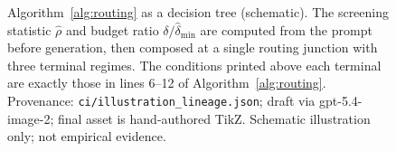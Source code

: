 \begin{figure}[!htb]
{
}
\caption{Algorithm~\ref{alg:routing} as a decision tree (schematic). The screening statistic $\hat{\rho}$ and budget ratio $\delta/\widehat{\delta}_{\min}$ are computed from the prompt before generation, then composed at a single routing junction with three terminal regimes. The conditions printed above each terminal are exactly those in lines 6--12 of Algorithm~\ref{alg:routing}. Provenance: \texttt{ci/illustration\_lineage.json}; draft via gpt-5.4-image-2; final asset is hand-authored TikZ. Schematic illustration only; not empirical evidence.}
\label{fig:algorithm1_routing}
\end{figure}
